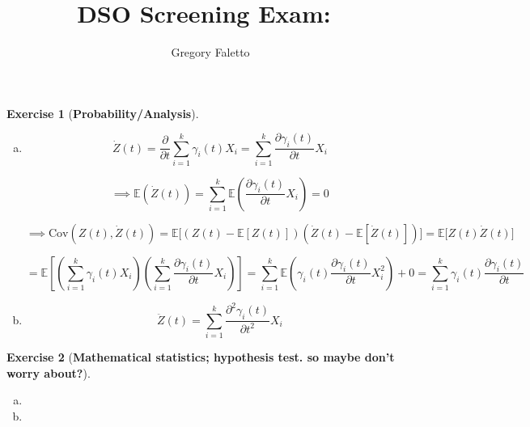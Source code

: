 \documentclass{article}
\title{
    \vspace{2in}
    \textmd{\textbf{DSO Screening Exam:\ \hmwkTitle}}\\
    \vspace{3in}
}
\author{Gregory Faletto}
\date{}
\theoremstyle{definition}
\newtheorem{exercise}{Exercise}
\theoremstyle{definition}
\theoremstyle{definition}
\theoremstyle{definition}
\newcommand{\E}{\mathbb{E}}
\newcommand{\pderiv}[2]{\frac{\partial #1}{\partial #2}}
\newcommand{\Cov}{\mathrm{Cov}}
\begin{document}
\maketitle

\pagebreak


\begin{exercise}[\textbf{Probability/Analysis}]

\begin{enumerate}[(a)]

\item

\[
\dot{Z}(t) =  \pderiv{}{t} \sum_{i=1}^k \gamma_i(t) X_i =   \sum_{i=1}^k   \pderiv{\gamma_i(t) }{t} X_i 
\]

\[
\implies \E \left( \dot{Z}(t)  \right) =    \sum_{i=1}^k   \E \left( \pderiv{\gamma_i(t) }{t} X_i \right) = 0
\]

\[
\implies \Cov(Z(t), \dot{Z}(t)) = \E \big[ (Z(t) - \E[ Z(t)])(\dot{Z}(t)  - \E[\dot{Z}(t) ]) \big]  = \E \big[ Z(t) \dot{Z}(t)  \big]  
\]

\[
= \E \left[  \left(  \sum_{i=1}^k \gamma_i(t) X_i   \right) \left( \sum_{i=1}^k   \pderiv{\gamma_i(t) }{t} X_i  \right)  \right] = \sum_{i=1}^k \E \left( \gamma_i(t)  \pderiv{\gamma_i(t) }{t}  X_i^2 \right) + 0 = \sum_{i=1}^k \gamma_i(t)  \pderiv{\gamma_i(t) }{t} 
\]

\item

\[
\ddot{Z}(t) =  \sum_{i=1}^k   \pderiv{^2\gamma_i(t) }{t^2} X_i 
\]

\end{enumerate}

\end{exercise}

\begin{exercise}[\textbf{Mathematical statistics; hypothesis test. so maybe don't worry about?}]

\begin{enumerate}[(a)]

\item

\item

\end{enumerate}

\end{exercise}
\end{document}
